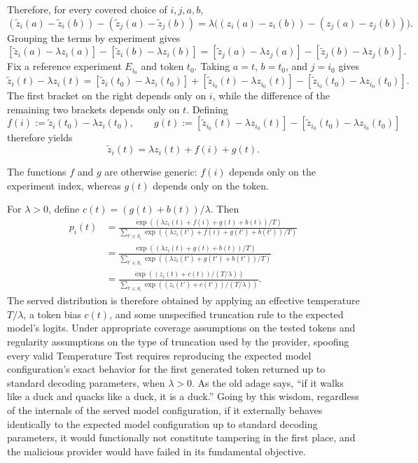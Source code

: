 \documentclass{article}
\begin{document}
Therefore, for every covered choice of $i,j,a,b$,
\[
(\widetilde{z}_i(a)-\widetilde{z}_i(b))-
(\widetilde{z}_j(a)-\widetilde{z}_j(b))
=\lambda\bigl((z_i(a)-z_i(b))-(z_j(a)-z_j(b))\bigr).
\]
Grouping the terms by experiment gives
\[
[\widetilde{z}_i(a)-\lambda z_i(a)]-
[\widetilde{z}_i(b)-\lambda z_i(b)]
=
[\widetilde{z}_j(a)-\lambda z_j(a)]-
[\widetilde{z}_j(b)-\lambda z_j(b)].
\]
Fix a reference experiment $E_{i_0}$ and token $t_0$. Taking $a=t$, $b=t_0$,
and $j=i_0$ gives
\[
\widetilde{z}_i(t)-\lambda z_i(t)
= [\widetilde{z}_i(t_0)-\lambda z_i(t_0)]
+ [\widetilde{z}_{i_0}(t)-\lambda z_{i_0}(t)]
- [\widetilde{z}_{i_0}(t_0)-\lambda z_{i_0}(t_0)].
\]
The first bracket on the right depends only on $i$, while the difference of the
remaining two brackets depends only on $t$. Defining
\[
f(i):=\widetilde{z}_i(t_0)-\lambda z_i(t_0),
\qquad
g(t):=[\widetilde{z}_{i_0}(t)-\lambda z_{i_0}(t)]
-[\widetilde{z}_{i_0}(t_0)-\lambda z_{i_0}(t_0)]
\]
therefore yields
\[
\widetilde{z}_i(t)=\lambda z_i(t)+f(i)+g(t).
\]

The functions $f$ and $g$ are otherwise generic: $f(i)$ depends only on the
experiment index, whereas $g(t)$ depends only on the token.

For $\lambda>0$, define $c(t)=(g(t)+b(t))/\lambda$. Then
\begin{align*}
p_i(t)
&=\frac{\exp((\lambda z_i(t)+f(i)+g(t)+b(t))/T)}
        {\sum_{t'\in S_i}\exp((\lambda z_i(t')+f(i)+g(t')+b(t'))/T)}\\
&=\frac{\exp((\lambda z_i(t)+g(t)+b(t))/T)}
        {\sum_{t'\in S_i}\exp((\lambda z_i(t')+g(t')+b(t'))/T)}\\
&=\frac{\exp((z_i(t)+c(t))/(T/\lambda))}
        {\sum_{t'\in S_i}\exp((z_i(t')+c(t'))/(T/\lambda))}.
\end{align*}
The served distribution is therefore obtained by applying an effective
temperature $T/\lambda$, a token bias $c(t)$, and some unspecified truncation
rule to the expected model's logits. Under appropriate coverage assumptions on the tested
tokens and regularity assumptions on the type of truncation used by the
provider, spoofing every valid Temperature Test requires reproducing
the expected model configuration's exact behavior for the first generated token returned up to
standard decoding parameters, when $\lambda>0$. As the old adage says,
``if it walks like a duck and quacks like a duck, it is a duck.'' Going by this wisdom, regardless of the internals of the served model configuration, if it externally
behaves identically to the expected model configuration up to standard decoding parameters, it would
functionally not constitute tampering in the first place, and the malicious
provider would have failed in its fundamental objective.
\end{document}
